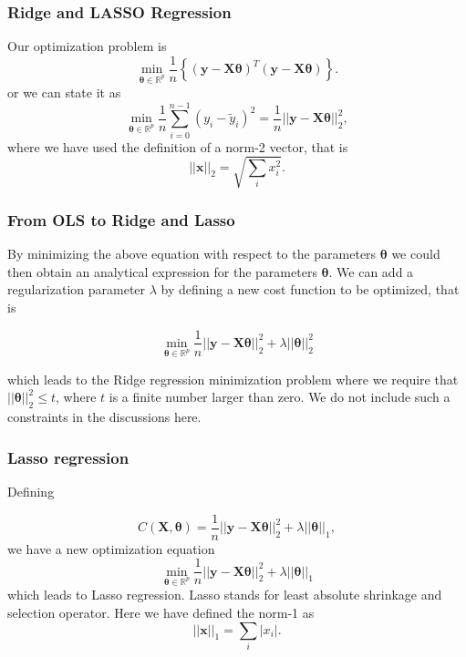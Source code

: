 \documentclass{beamer}
\begin{document}
\begin{frame}
\frametitle{Ridge and LASSO Regression}

Our optimization problem is
\[
{\displaystyle \min_{\bm{\theta}\in {\mathbb{R}}^{p}}}\frac{1}{n}\left\{\left(\bm{y}-\bm{X}\bm{\theta}\right)^T\left(\bm{y}-\bm{X}\bm{\theta}\right)\right\}.
\]
or we can state it as
\[
{\displaystyle \min_{\bm{\theta}\in
{\mathbb{R}}^{p}}}\frac{1}{n}\sum_{i=0}^{n-1}\left(y_i-\tilde{y}_i\right)^2=\frac{1}{n}\vert\vert \bm{y}-\bm{X}\bm{\theta}\vert\vert_2^2,
\]
where we have used the definition of  a norm-2 vector, that is
\[
\vert\vert \bm{x}\vert\vert_2 = \sqrt{\sum_i x_i^2}. 
\]
\end{frame}

\begin{frame}
\frametitle{From OLS to Ridge and Lasso}

By minimizing the above equation with respect to the parameters
$\bm{\theta}$ we could then obtain an analytical expression for the
parameters $\bm{\theta}$.  We can add a regularization parameter $\lambda$ by
defining a new cost function to be optimized, that is

\[
{\displaystyle \min_{\bm{\theta}\in
{\mathbb{R}}^{p}}}\frac{1}{n}\vert\vert \bm{y}-\bm{X}\bm{\theta}\vert\vert_2^2+\lambda\vert\vert \bm{\theta}\vert\vert_2^2
\]

which leads to the Ridge regression minimization problem where we
require that $\vert\vert \bm{\theta}\vert\vert_2^2\le t$, where $t$ is
a finite number larger than zero. We do not include such a constraints in the discussions here.
\end{frame}

\begin{frame}
\frametitle{Lasso regression}

Defining

\[
C(\bm{X},\bm{\theta})=\frac{1}{n}\vert\vert \bm{y}-\bm{X}\bm{\theta}\vert\vert_2^2+\lambda\vert\vert \bm{\theta}\vert\vert_1,
\]
we have a new optimization equation
\[
{\displaystyle \min_{\bm{\theta}\in
{\mathbb{R}}^{p}}}\frac{1}{n}\vert\vert \bm{y}-\bm{X}\bm{\theta}\vert\vert_2^2+\lambda\vert\vert \bm{\theta}\vert\vert_1
\]
which leads to Lasso regression. Lasso stands for least absolute shrinkage and selection operator. 
Here we have defined the norm-1 as 
\[
\vert\vert \bm{x}\vert\vert_1 = \sum_i \vert x_i\vert. 
\]
\end{frame}
\end{document}

